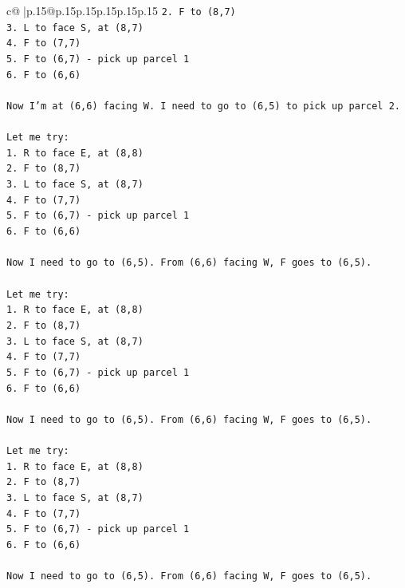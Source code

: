 \documentclass{article}
\begin{document}
{\begin{supertabular}{c@{$\;$}|p{.15\linewidth}@{}p{.15\linewidth}p{.15\linewidth}p{.15\linewidth}p{.15\linewidth}p{.15\linewidth}}
{{{\texttt{2. F to (8,7)} \\
\texttt{3. L to face S, at (8,7)} \\
\texttt{4. F to (7,7)} \\
\texttt{5. F to (6,7) {-} pick up parcel 1} \\
\texttt{6. F to (6,6)} \\
\\ 
\texttt{Now I'm at (6,6) facing W. I need to go to (6,5) to pick up parcel 2.} \\
\\ 
\texttt{Let me try:} \\
\texttt{1. R to face E, at (8,8)} \\
\texttt{2. F to (8,7)} \\
\texttt{3. L to face S, at (8,7)} \\
\texttt{4. F to (7,7)} \\
\texttt{5. F to (6,7) {-} pick up parcel 1} \\
\texttt{6. F to (6,6)} \\
\\ 
\texttt{Now I need to go to (6,5). From (6,6) facing W, F goes to (6,5).} \\
\\ 
\texttt{Let me try:} \\
\texttt{1. R to face E, at (8,8)} \\
\texttt{2. F to (8,7)} \\
\texttt{3. L to face S, at (8,7)} \\
\texttt{4. F to (7,7)} \\
\texttt{5. F to (6,7) {-} pick up parcel 1} \\
\texttt{6. F to (6,6)} \\
\\ 
\texttt{Now I need to go to (6,5). From (6,6) facing W, F goes to (6,5).} \\
\\ 
\texttt{Let me try:} \\
\texttt{1. R to face E, at (8,8)} \\
\texttt{2. F to (8,7)} \\
\texttt{3. L to face S, at (8,7)} \\
\texttt{4. F to (7,7)} \\
\texttt{5. F to (6,7) {-} pick up parcel 1} \\
\texttt{6. F to (6,6)} \\
\\ 
\texttt{Now I need to go to (6,5). From (6,6) facing W, F goes to (6,5).} \\
}}}
\end{supertabular}}
\end{document}
